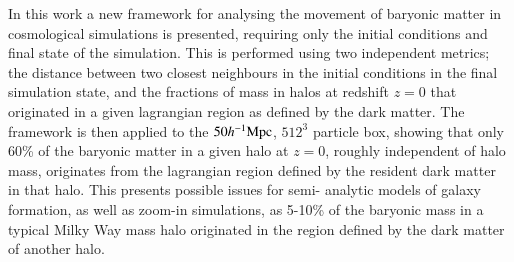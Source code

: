In this work a new framework for analysing the movement of baryonic matter in
cosmological simulations is presented, requiring only the initial conditions
and final state of the simulation. This is performed using two independent
metrics; the distance between two closest neighbours in the initial conditions
in the final simulation state, and the fractions of mass in halos at redshift
$z=0$ that originated in a given lagrangian region as defined by the dark
matter. The framework is then applied to the $50h^{-1}{\rm Mpc}{}$, $512^3$ particle
\simba{} box, showing that only 60\% of the baryonic matter in a given halo at
$z=0$, roughly independent of halo mass, originates from the lagrangian region
defined by the resident dark matter in that halo. This presents possible
issues for semi- analytic models of galaxy formation, as well as zoom-in
simulations, as 5-10\% of the baryonic mass in a typical Milky Way mass halo
originated in the region defined by the dark matter of another halo.
